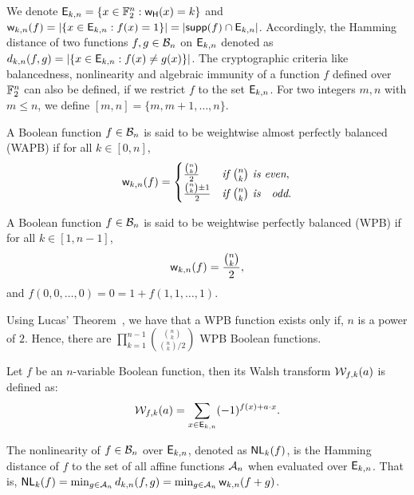 \documentclass{llncs}
\begin{document}
We denote $\mathsf{E}_{k,n} = \{x \in \mathbb{F}_2^n : \mathsf{w_H}(x)=k\}$ and $\mathsf{w}_{k,n}(f) = |\{x \in \mathsf{E}_{k,n} : f(x) = 1 \}| = |\mathsf{supp}(f) \cap \mathsf{E}_{k,n}|$. Accordingly, the Hamming distance of two functions $f, g \in \mathcal{B}_n$ on $\mathsf{E}_{k,n}$ denoted as $d_{k,n}(f,g) = |\{x \in \mathsf{E}_{k,n} : f(x) \neq g(x)\}|$. The cryptographic criteria like balancedness, nonlinearity and algebraic immunity of a function $f$ defined over $\mathbb{F}_2^n$ can also be defined, if we restrict $f$ to the set $\mathsf{E}_{k,n}$. For two integers $m, n$ with $m \leq n$, we define $[m,n] = \{m, m+1, \ldots, n\}$.

\begin{definition}\label{def:WAPB}
A Boolean function $f \in \mathcal{B}_n$ is said to be weightwise almost perfectly balanced (WAPB) if for all $k \in [0,n]$, \[\mathsf{w}_{k,n}(f)=
\begin{cases}
\frac{{n\choose k}}{2} & \textit{if } {n \choose k} \textit{ is even},\\
\frac{{n \choose k}\pm 1}{2} & \textit{if } {n \choose k} \textit{ is \; odd}.
\end{cases} \]
\end{definition}

\begin{definition}\label{def:WPB}
A Boolean function $f \in \mathcal{B}_n$ is said to be weightwise perfectly balanced (WPB) if for all $k \in [1,n-1]$, 
\[\mathsf{w}_{k,n}(f) = \frac{{n \choose k}}{2},\]
and $f(0,0,\ldots,0)=0=1+f(1,1,\ldots,1)$.
\end{definition}

Using Lucas' Theorem~\cite{AMM:F47}, we have that a WPB function exists only if, $n$ is a power of $2$. Hence, there are $\displaystyle {\prod_{k = 1}^{n-1} {{{n \choose k}} \choose {{n \choose k}/2}}}$ WPB Boolean functions.

\begin{definition}\label{def:restWalsh}
Let $f$ be an $n$-variable Boolean function, then its Walsh transform $\mathcal{W}_{f,k}(a)$ is defined as:
\[\mathcal{W}_{f,k}(a) = \sum_{x \in \mathsf{E}_{k,n}} (-1)^{f(x)+ a \cdot x}.\]
\end{definition}

\begin{definition}\label{def:wtNl}
The nonlinearity of $f \in \mathcal{B}_n$ over $\mathsf{E}_{k,n}$, denoted as $\mathsf{NL}_{k}(f)$, is the Hamming distance of $f$ to the set of all affine functions $\mathcal{A}_n$ when evaluated over $\mathsf{E}_{k,n}$. 
That is, $\mathsf{NL}_{k}(f) = \min_{g \in \mathcal{A}_n} d_{k,n}(f,g) = \min_{g \in \mathcal{A}_n} \mathsf{w}_{k,n}(f+g)$.\\
\end{definition}
\end{document}
